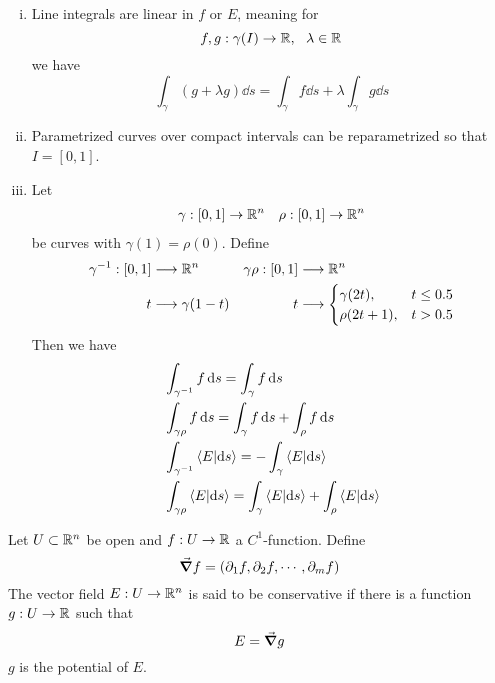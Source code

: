 \documentclass[../../script.tex]{subfiles}
\begin{document}
\begin{rem}
    \begin{enumerate}[(i)]
        \item Line integrals are linear in $f$ or $E$, meaning for 
        \[
            f, g: \gamma(I) \rightarrow \mathbb{R}, ~~\lambda \in \mathbb{R}
        \]
        we have
        \[
            \int_{\gamma}(g + \lambda g) \dd{s} = \int_{\gamma} f \dd{s} + \lambda \int_{\gamma} g \dd{s}
        \]

        \item Parametrized curves over compact intervals can be reparametrized so that $I = [0, 1]$.
        
        \item Let 
        \begin{align*}
            \gamma: [0, 1] \rightarrow \mathbb{R}^n && \rho: [0, 1] \rightarrow \mathbb{R}^n
        \end{align*}
        be curves with $\gamma(1) = \rho(0)$. Define 
        \begin{align*}
            {\gamma}^{-1}: [0, 1] &\longrightarrow \mathbb{R}^n & \gamma\rho: [0, 1] &\longrightarrow \mathbb{R}^n \\
            t &\longrightarrow \gamma(1 - t) & t &\longrightarrow \begin{cases}
                \gamma(2t), & t \le 0.5 \\
                \rho(2t + 1), & t > 0.5
            \end{cases}
        \end{align*}
        Then we have 
        \begin{align*}
            &\int_{\inv{\gamma}} f \dd{s} = \int_{\gamma} f \dd{s} \\
            &\int_{\gamma\rho} f \dd{s} = \int_{\gamma} f \dd{s} + \int_{\rho} f \dd{s} \\
            &\int_{\inv{\gamma}} \innerproduct{E}{\dd{s}} = -\int_{\gamma} \innerproduct{E}{\dd{s}} \\
            &\int_{\gamma\rho} \innerproduct{E}{\dd{s}} = \int_{\gamma} \innerproduct{E}{\dd{s}} + \int_{\rho} \innerproduct{E}{\dd{s}}
        \end{align*}
    \end{enumerate}
\end{rem}

\begin{defi}
    Let $U \subset \mathbb{R}^n$ be open and $f: U \rightarrow \mathbb{R}$ a $C^1$-function. Define 
    \[
        \grad f = (\partial_1 f, \partial_2 f, \cdots, \partial_m f)
    \]
    The vector field $E: U \rightarrow \mathbb{R}^n$ is said to be conservative if there is a function $g: U \rightarrow \mathbb{R}$ such that 
    \[
        E = \grad{g}
    \]
    $g$ is the potential of $E$.
\end{defi}
\end{document}
